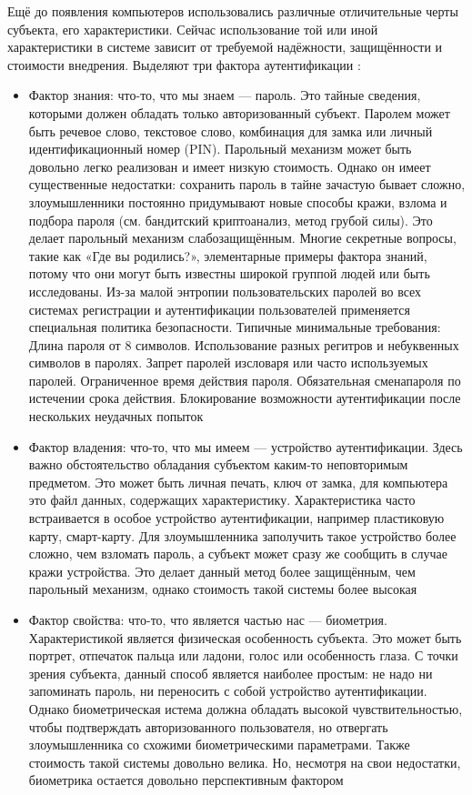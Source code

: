 Ещё до появления компьютеров использовались различные отличительные черты субъекта, его
характеристики. Сейчас использование той или иной характеристики в системе зависит от требуемой
надёжности, защищённости и стоимости внедрения. Выделяют три фактора аутентификации \cite{crypto-methods}:
\begin{itemize}
    \item Фактор знания: что-то, что мы знаем — пароль. Это тайные сведения, которыми должен
        обладать только авторизованный субъект. Паролем может быть речевое слово, текстовое слово,
        комбинация для замка или личный идентификационный номер (PIN). Парольный механизм может
        быть довольно легко реализован и имеет низкую стоимость. Однако он имеет существенные
        недостатки: сохранить пароль в тайне зачастую бывает сложно, злоумышленники постоянно
        придумывают новые способы кражи, взлома и подбора пароля (см. бандитский криптоанализ,
        метод грубой силы). Это делает парольный механизм слабозащищённым. Многие секретные
        вопросы, такие как «Где вы родились?», элементарные примеры фактора знаний, потому что они
        могут быть известны широкой группой людей или быть исследованы. Из-за малой энтропии
        пользовательских паролей во всех системах регистрации и аутентификации пользователей
        применяется специальная политика безопасности. Типичные минимальные требования: Длина
        пароля от 8 символов. Использование разных регитров и небуквенных символов в паролях.
        Запрет паролей изсловаря или часто используемых паролей. Ограниченное время действия
        пароля. Обязательная сменапароля по истечении срока действия. Блокирование возможности
        аутентификации после нескольких неудачных попыток
    \item Фактор владения: что-то, что мы имеем — устройство аутентификации. Здесь важно
        обстоятельство обладания субъектом каким-то неповторимым предметом. Это может быть личная
        печать, ключ от замка, для компьютера это файл данных, содержащих характеристику.
        Характеристика часто встраивается в особое устройство аутентификации, например пластиковую
        карту, смарт-карту. Для злоумышленника заполучить такое устройство более сложно, чем взломать
        пароль, а субъект может сразу же сообщить в случае кражи устройства. Это делает данный метод
        более защищённым, чем парольный механизм, однако стоимость такой системы более высокая
    \item Фактор свойства: что-то, что является частью нас — биометрия. Характеристикой является
        физическая особенность субъекта. Это может быть портрет, отпечаток пальца или ладони, голос или
        особенность глаза. С точки зрения субъекта, данный способ является наиболее простым: не надо ни
        запоминать пароль, ни переносить с собой устройство аутентификации. Однако биометрическая
        истема должна обладать высокой чувствительностью, чтобы подтверждать авторизованного
        пользователя, но отвергать злоумышленника со схожими биометрическими параметрами. Также
        стоимость такой системы довольно велика. Но, несмотря на свои недостатки, биометрика
        остается довольно перспективным фактором
\end{itemize}


